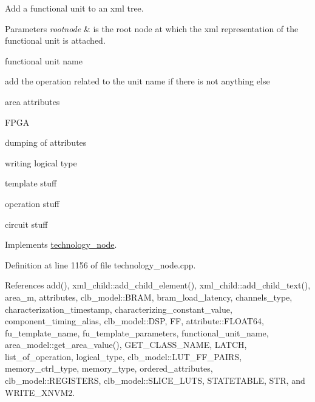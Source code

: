 Add a functional unit to an xml tree. 


\begin{DoxyParams}{Parameters}
{\em rootnode} & is the root node at which the xml representation of the functional unit is attached. \\
\hline
\end{DoxyParams}
functional unit name

add the operation related to the unit name if there is not anything else

area attributes

F\+P\+GA

dumping of attributes

writing logical type

template stuff

operation stuff

circuit stuff 

Implements \hyperlink{structtechnology__node_a8ce6644a0b2700f760936e4c02754e2f}{technology\+\_\+node}.



Definition at line 1156 of file technology\+\_\+node.\+cpp.



References add(), xml\+\_\+child\+::add\+\_\+child\+\_\+element(), xml\+\_\+child\+::add\+\_\+child\+\_\+text(), area\+\_\+m, attributes, clb\+\_\+model\+::\+B\+R\+AM, bram\+\_\+load\+\_\+latency, channels\+\_\+type, characterization\+\_\+timestamp, characterizing\+\_\+constant\+\_\+value, component\+\_\+timing\+\_\+alias, clb\+\_\+model\+::\+D\+SP, FF, attribute\+::\+F\+L\+O\+A\+T64, fu\+\_\+template\+\_\+name, fu\+\_\+template\+\_\+parameters, functional\+\_\+unit\+\_\+name, area\+\_\+model\+::get\+\_\+area\+\_\+value(), G\+E\+T\+\_\+\+C\+L\+A\+S\+S\+\_\+\+N\+A\+ME, L\+A\+T\+CH, list\+\_\+of\+\_\+operation, logical\+\_\+type, clb\+\_\+model\+::\+L\+U\+T\+\_\+\+F\+F\+\_\+\+P\+A\+I\+RS, memory\+\_\+ctrl\+\_\+type, memory\+\_\+type, ordered\+\_\+attributes, clb\+\_\+model\+::\+R\+E\+G\+I\+S\+T\+E\+RS, clb\+\_\+model\+::\+S\+L\+I\+C\+E\+\_\+\+L\+U\+TS, S\+T\+A\+T\+E\+T\+A\+B\+LE, S\+TR, and W\+R\+I\+T\+E\+\_\+\+X\+N\+V\+M2.

